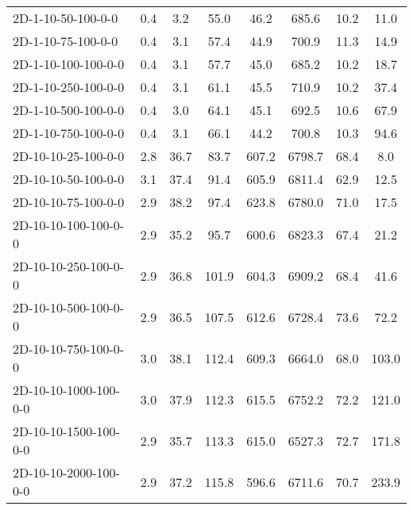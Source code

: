 \documentclass{article}
\begin{document}
\begin{table}[h]
\begin{center}
\begin{tabular}{|l||c|c|c|c|c|c|c|}
            2D-1-10-50-100-0-0             & 0.4  & 3.2       & 55.0       & 46.2        & 685.6    & 10.2      & 11.0       \\
            2D-1-10-75-100-0-0             & 0.4  & 3.1       & 57.4       & 44.9        & 700.9    & 11.3      & 14.9       \\
            2D-1-10-100-100-0-0            & 0.4  & 3.1       & 57.7       & 45.0        & 685.2    & 10.2      & 18.7       \\
            2D-1-10-250-100-0-0            & 0.4  & 3.1       & 61.1       & 45.5        & 710.9    & 10.2      & 37.4       \\
            2D-1-10-500-100-0-0            & 0.4  & 3.0       & 64.1       & 45.1        & 692.5    & 10.6      & 67.9       \\
            2D-1-10-750-100-0-0            & 0.4  & 3.1       & 66.1       & 44.2        & 700.8    & 10.3      & 94.6       \\
            \hline
            2D-10-10-25-100-0-0            & 2.8  & 36.7      & 83.7       & 607.2       & 6798.7   & 68.4      & 8.0        \\
            2D-10-10-50-100-0-0            & 3.1  & 37.4      & 91.4       & 605.9       & 6811.4   & 62.9      & 12.5       \\
            2D-10-10-75-100-0-0            & 2.9  & 38.2      & 97.4       & 623.8       & 6780.0   & 71.0      & 17.5       \\
            2D-10-10-100-100-0-0           & 2.9  & 35.2      & 95.7       & 600.6       & 6823.3   & 67.4      & 21.2       \\
            2D-10-10-250-100-0-0           & 2.9  & 36.8      & 101.9      & 604.3       & 6909.2   & 68.4      & 41.6       \\
            2D-10-10-500-100-0-0           & 2.9  & 36.5      & 107.5      & 612.6       & 6728.4   & 73.6      & 72.2       \\
            2D-10-10-750-100-0-0           & 3.0  & 38.1      & 112.4      & 609.3       & 6664.0   & 68.0      & 103.0      \\
            2D-10-10-1000-100-0-0          & 3.0  & 37.9      & 112.3      & 615.5       & 6752.2   & 72.2      & 121.0      \\
            2D-10-10-1500-100-0-0          & 2.9  & 35.7      & 113.3      & 615.0       & 6527.3   & 72.7      & 171.8      \\
            2D-10-10-2000-100-0-0          & 2.9  & 37.2      & 115.8      & 596.6       & 6711.6   & 70.7      & 233.9      \\

\end{tabular}
\end{center}
\end{table}
\end{document}
